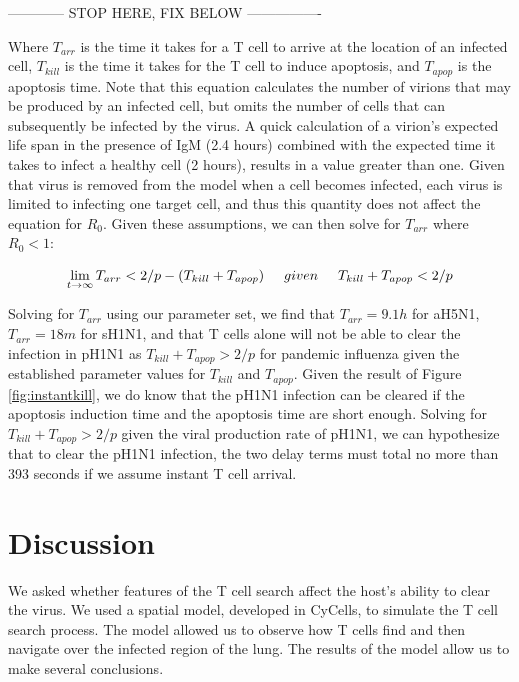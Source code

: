 \documentclass[10pt]{article}
\begin{document}
------------ STOP HERE, FIX BELOW  ----------------

Where $T_{arr}$ is the time it takes for a T cell to arrive at the location of an infected cell, $T_{kill}$ is the time it takes for the T cell to induce apoptosis, and $T_{apop}$ is the apoptosis time.  Note that this equation calculates the number of virions that may be produced by an infected cell, but omits the number of cells that can subsequently be infected by the virus.  A quick calculation of a virion's expected life span in the presence of IgM (2.4 hours) combined with the expected time it takes to infect a healthy cell (2 hours), results in a value greater than one.  Given that virus is removed from the model when a cell becomes infected, each virus is limited to infecting one target cell, and thus this quantity does not affect the equation for $R_0$.  Given these assumptions, we can then solve for $T_{arr}$ where $R_0 < 1$:

\begin{equation*}
\lim_{t \to \infty} T_{arr} < 2 / p - (T_{kill} + T_{apop})   \hspace{0.5cm} given  \hspace{0.5cm}  T_{kill} + T_{apop} < 2/p
\end{equation*}

Solving for $T_{arr}$ using our parameter set, we find that $T_{arr} = 9.1h$ for aH5N1, $T_{arr} = 18m$ for sH1N1, and that T cells alone will not be able to clear the infection in pH1N1 as  $T_{kill} + T_{apop} > 2/p$ for pandemic influenza given the established parameter values for $T_{kill}$ and $T_{apop}$.  Given the result of Figure \ref{fig:instantkill}, we do know that the pH1N1 infection can be cleared if the apoptosis induction time and the apoptosis time are short enough.  Solving for $T_{kill} + T_{apop} > 2/p$  given the viral production rate of pH1N1, we can hypothesize that to clear the pH1N1 infection, the two delay terms must total no more than 393 seconds if we assume instant T cell arrival.


\section*{Discussion}

We asked whether features of the T cell search affect the host's ability to clear the virus.  We used a spatial model, developed in CyCells, to simulate the T cell search process.  The model allowed us to observe how T cells find and then navigate over the infected region of the lung.  The results of the model allow us to make several conclusions.  
\end{document}
